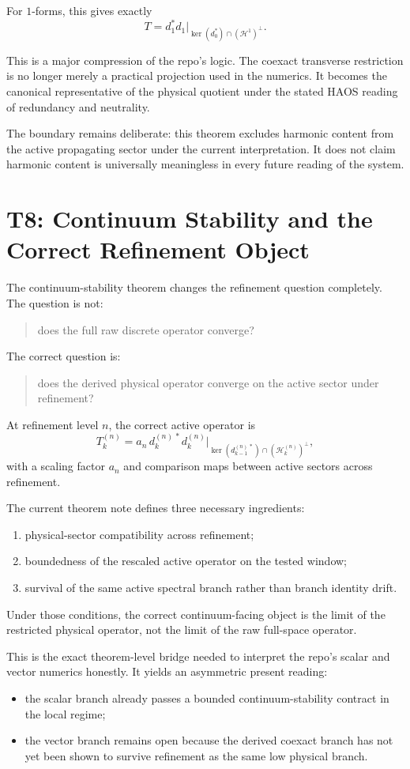 \documentclass[11pt]{article}
\begin{document}
For $1$-forms, this gives exactly
\[
T
=
d_1^* d_1 \big|_{\ker(d_0^*) \cap (\mathcal H^1)^\perp}.
\]

This is a major compression of the repo's logic. The coexact transverse restriction is no longer merely a practical projection used in the numerics. It becomes the canonical representative of the physical quotient under the stated HAOS reading of redundancy and neutrality.

The boundary remains deliberate: this theorem excludes harmonic content from the active propagating sector under the current interpretation. It does not claim harmonic content is universally meaningless in every future reading of the system.

\section{T8: Continuum Stability and the Correct Refinement Object}

The continuum-stability theorem changes the refinement question completely. The question is not:
\begin{quote}
does the full raw discrete operator converge?
\end{quote}

The correct question is:
\begin{quote}
does the derived physical operator converge on the active sector under refinement?
\end{quote}

At refinement level $n$, the correct active operator is
\[
T_k^{(n)}
=
a_n\, d_k^{(n)\,*}d_k^{(n)}
\big|_{\ker(d_{k-1}^{(n)\,*}) \cap (\mathcal H_k^{(n)})^\perp},
\]
with a scaling factor $a_n$ and comparison maps between active sectors across refinement.

The current theorem note defines three necessary ingredients:
\begin{enumerate}
\item physical-sector compatibility across refinement;
\item boundedness of the rescaled active operator on the tested window;
\item survival of the same active spectral branch rather than branch identity drift.
\end{enumerate}

Under those conditions, the correct continuum-facing object is the limit of the restricted physical operator, not the limit of the raw full-space operator.

This is the exact theorem-level bridge needed to interpret the repo's scalar and vector numerics honestly. It yields an asymmetric present reading:
\begin{itemize}
\item the scalar branch already passes a bounded continuum-stability contract in the local regime;
\item the vector branch remains open because the derived coexact branch has not yet been shown to survive refinement as the same low physical branch.
\end{itemize}
\end{document}
